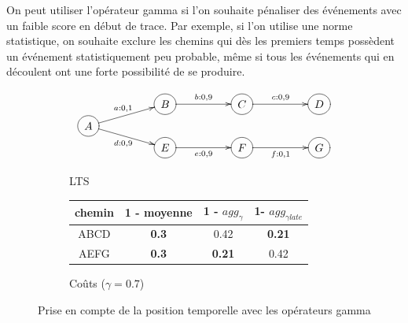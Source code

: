     
    On peut utiliser l'opérateur gamma si l'on souhaite pénaliser des événements avec un faible score en début de trace. Par exemple, si l'on utilise une norme statistique, on souhaite exclure les chemins qui dès les premiers temps possèdent un événement statistiquement peu probable, même si tous les événements qui en découlent ont une forte possibilité de se produire. 


    \begin{figure}[h!]
        \centering
        \begin{subfigure}[b]{0.45\textwidth}
            \centering
            \[
            \xymatrix @R=0.1em@C=5em {
             & *++[o][F-]{B} \ar[r]^{b:0,9} & *++[o][F-]{C} \ar[r]^{c:0,9} & *++[o][F-]{D}  \\
              *++[o][F-]{A} \ar[ru]^{a:0,1} \ar[rd]_{d:0,9} \\
            & *++[o][F-]{E} \ar[r]_{e:0,9} & *++[o][F-]{F} \ar[r]_{f:0,1}  & *++[o][F-]{G}
            }
            \]
            \caption{LTS}
            \label{fig:lts_gamma}
        \end{subfigure}
        \hfill
        \begin{subfigure}[b]{0.45\textwidth}
            \centering
            \begin{tabular}{cccc}
                chemin & 1 - moyenne & 1 - $agg_{\gamma}$ & 1- $agg_{\gamma late}$  \\
                \hline
                ABCD & \textbf{ 0.3} & 0.42 &\textbf{ 0.21} \\
                AEFG & \textbf{0.3} & \textbf{0.21} & 0.42\\
            \end{tabular}
            \caption{Coûts ($\gamma =0.7$)}
        \end{subfigure}
        \caption{Prise en compte de la position temporelle avec les opérateurs gamma}
        \label{fig:gamma}
    \end{figure}


